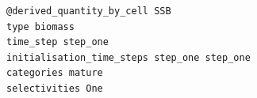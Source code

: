 {\small{\begin{verbatim}
@derived_quantity_by_cell SSB
type biomass
time_step step_one
initialisation_time_steps step_one step_one
categories mature
selectivities One
\end{verbatim}}}
%
%
%
%

